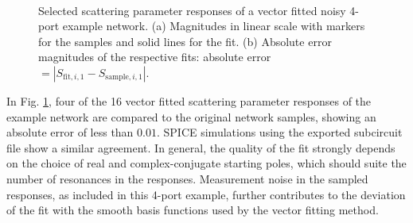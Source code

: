 \documentclass{IEEEjmw}
\begin{document}
\begin{figure}
\centering
{}
\\
\vspace{-4mm}
\caption{Selected scattering parameter responses of a vector fitted noisy 4-port example network. (a) Magnitudes in linear scale with markers for the samples and solid lines for the fit. (b) Absolute error magnitudes of the respective fits: absolute error $ = |S_{\mathrm{fit},i,1} - S_{\mathrm{sample},i,1}|$.}
\label{figs:vectfit}
\end{figure}

In Fig. \ref{figs:vectfit}, four of the 16 vector fitted scattering parameter responses of the example network are compared to the original network samples, showing an absolute error of less than $0.01$. SPICE simulations using the exported subcircuit file show a similar agreement. In general, the quality of the fit strongly depends on the choice of real and complex-conjugate starting poles, which should suite the number of resonances in the responses. Measurement noise in the sampled responses, as included in this 4-port example, further contributes to the deviation of the fit with the smooth basis functions used by the vector fitting method.
\end{document}
